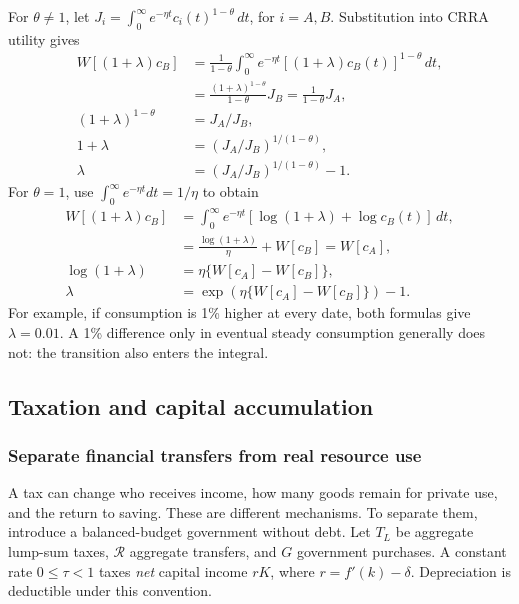 For $\theta\ne1$, let
$J_i=\int_0^\infty e^{-\eta t}c_i(t)^{1-\theta}\,dt$, for $i=A,B$.
Substitution into CRRA utility gives
\begin{align}
W[(1+\lambda)c_B]
 &=\frac{1}{1-\theta}\int_0^\infty e^{-\eta t}
                 [(1+\lambda)c_B(t)]^{1-\theta}\,dt,\\
 &=\frac{(1+\lambda)^{1-\theta}}{1-\theta}J_B
  =\frac{1}{1-\theta}J_A,\\
(1+\lambda)^{1-\theta}&=J_A/J_B,\\
1+\lambda&=(J_A/J_B)^{1/(1-\theta)},\\
\lambda&=(J_A/J_B)^{1/(1-\theta)}-1.
\end{align}
For $\theta=1$, use $\int_0^\infty e^{-\eta t}dt=1/\eta$ to obtain
\begin{align}
W[(1+\lambda)c_B]
 &=\int_0^\infty e^{-\eta t}[\log(1+\lambda)+\log c_B(t)]\,dt,\\
 &=\frac{\log(1+\lambda)}{\eta}+W[c_B]=W[c_A],\\
\log(1+\lambda)&=\eta\{W[c_A]-W[c_B]\},\\
\lambda&=\exp\!\left(\eta\{W[c_A]-W[c_B]\}\right)-1.
\end{align}
For example, if consumption is 1\% higher at every date, both formulas give
$\lambda=0.01$. A 1\% difference only in eventual steady consumption generally
does not: the transition also enters the integral.

\subsection{Taxation and capital accumulation}\label{sec:ramsey-taxation}

\subsubsection{Separate financial transfers from real resource use}

A tax can change who receives income, how many goods remain for private use,
and the return to saving. These are different mechanisms. To separate them,
introduce a balanced-budget government without debt. Let $T_L$ be aggregate
lump-sum taxes, $\mathcal R$ aggregate transfers, and $G$ government purchases.
A constant rate $0\le\tau<1$ taxes \emph{net} capital income $rK$, where
$r=f'(k)-\delta$. Depreciation is deductible under this convention.


